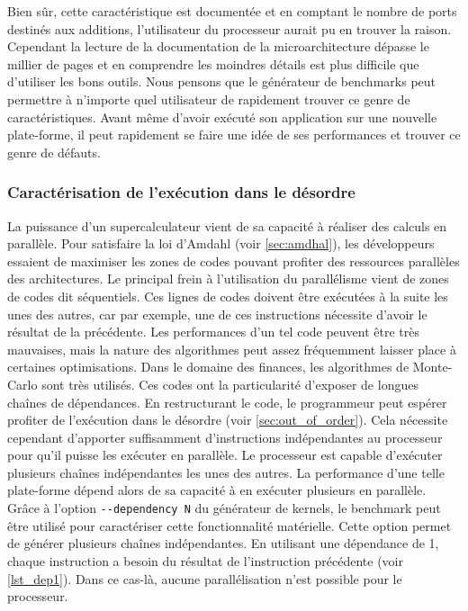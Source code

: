     Bien sûr, cette caractéristique est documentée et en comptant le nombre de ports destinés aux additions, l'utilisateur du processeur aurait pu en trouver la raison. Cependant la lecture de la documentation de la microarchitecture dépasse le millier de pages et en comprendre les moindres détails est plus difficile que d'utiliser les bons outils. Nous pensons que le générateur de benchmarks peut permettre à n'importe quel utilisateur de rapidement trouver ce genre de caractéristiques. Avant même d'avoir exécuté son application sur une nouvelle plate-forme, il peut rapidement se faire une idée de ses performances et trouver ce genre de défauts.




    \subsubsection{Caractérisation de l'exécution dans le désordre}

    La puissance d'un supercalculateur vient de sa capacité à réaliser des calculs en parallèle. Pour satisfaire la loi d'Amdahl (voir \autoref{sec:amdhal}), les développeurs essaient de maximiser les zones de codes pouvant profiter des ressources parallèles des architectures. Le principal frein à l'utilisation du parallélisme vient de zones de codes dit séquentiels. Ces lignes de codes doivent être exécutées à la suite les unes des autres, car par exemple, une de ces instructions nécessite d'avoir le résultat de la précédente. Les performances d'un tel code peuvent être très mauvaises, mais la nature des algorithmes peut assez fréquemment laisser place à certaines optimisations. Dans le domaine des finances, les algorithmes de Monte-Carlo sont très utilisés. Ces codes ont la particularité d'exposer de longues chaînes de dépendances. En restructurant le code, le programmeur peut espérer profiter de l'exécution dans le désordre (voir \autoref{sec:out_of_order}). Cela nécessite cependant d'apporter suffisamment d'instructions indépendantes au processeur pour qu'il puisse les exécuter en parallèle. Le processeur est capable d'exécuter plusieurs chaînes indépendantes les unes des autres. La performance d'une telle plate-forme dépend alors de sa capacité à en exécuter plusieurs en parallèle. Grâce à l'option \verb|--dependency N| du générateur de kernels, le benchmark peut être utilisé pour caractériser cette fonctionnalité matérielle. Cette option permet de générer plusieurs chaînes indépendantes. En utilisant une dépendance de 1, chaque instruction a besoin du résultat de l'instruction précédente (voir \autoref{lst_dep1}). Dans ce cas-là, aucune parallélisation n'est possible pour le processeur.
    
